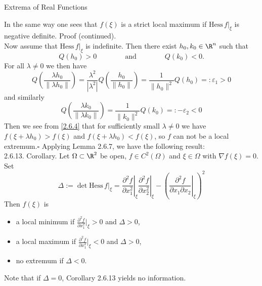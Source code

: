 \documentclass[smaller,hyperref={CJKbookmarks=true}]{beamer}
\begin{document}
\begin{frame}{Extrema of Real Functions}
\begin{spacing}{1.05}
In the same way one sees that $f(\xi)$ is a strict local maximum if $\text{Hess}\,f|_\xi$ is negative definite.
\newpage
\alert{Proof (continued).}\\
Now assume that $\text{Hess}\,f|_\xi$ is indefinite. Then there exist $h_0,k_0\in\R^n$ such that
\[Q(h_0)>0\qquad\qquad\text{and}\qquad\qquad
Q(k_0)<0.\]
For all $\lambda\neq0$ we then have
\[Q\left(\frac{\lambda h_0}{\|\lambda h_0\|}\right)=\frac{\lambda^2}{|\lambda^2|}
Q\left(\frac{h_0}{\|h_0\|}\right)=\frac{1}{\|h_0\|^2}
Q(h_0)=:\varepsilon_1>0\]
and similarly
\[Q\left(\frac{\lambda k_0}{\|\lambda k_0\|}\right)=\frac{1}{\|k_0\|^2}
Q(k_0)=:-\varepsilon_2<0\]
Then we see from \eqref{2.6.4} that for suf{}ficiently small $\lambda\neq0$ we have $f(\xi+\lambda h_0)>f(\xi)$ and $f(\xi+\lambda h_0)<f(\xi)$, so $f$ can not be a local extremum.$\square$
\newpage
Applying Lemma 2.6.7, we have the following result:\\[5pt]
\alert{2.6.13. Corollary.} Let $\Omega\subset\R^2$ be open, $f\in C^2(\Omega)$ and $\xi\in\Omega$ with $\nabla f(\xi)=0$. Set
\[\Delta:=\det\text{Hess}\,f|_\xi=\left.\frac{\partial^2 f}{\partial x_1^2}\right|_\xi\left.\frac{\partial^2f}{\partial x_2^2}\right|_\xi-\left(\left.\frac{\partial^2f}{\partial x_1\partial x_2}\right|_\xi\right)^2\]
Then $f(\xi)$ is
\begin{itemize}
  \item a local minimum if $\frac{\partial^2f}{\partial x_1^2}\Big|_\xi>0$ and $\Delta>0$,
  \item a local maximum if $\frac{\partial^2f}{\partial x_1^2}\Big|_\xi<0$ and $\Delta>0$,
  \item no extremum if $\Delta<0$.
\end{itemize}
\vspace*{13pt}
Note that if $\Delta=0$, Corollary 2.6.13 yields no information.
\end{spacing}
\end{frame}
\end{document}
